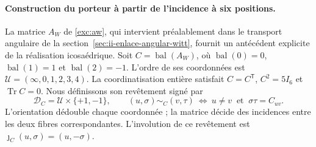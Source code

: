 \paragraph{Construction du porteur à partir de l'incidence à six positions.}
\label{ii:ico:construccion-firmada}
La matrice \(A_W\) de \eqref{exc:aw}, qui intervient préalablement dans le
transport angulaire de la section~\ref{sec:ii-enlace-angular-witt}, fournit
un antécédent explicite de la réalisation icosaédrique. Soit
\(C=\operatorname{bal}(A_W)\), où
\(\operatorname{bal}(0)=0\), \(\operatorname{bal}(1)=1\) et
\(\operatorname{bal}(2)=-1\). L’ordre de ses coordonnées est
\(\mathcal U=(\infty,0,1,2,3,4)\). La coordinatisation entière satisfait
\(C=C^{\mathsf T}\), \(C^2=5I_6\) et \(\operatorname{Tr}C=0\).
Nous définissons son revêtement signé par
\begin{equation}
 \mathcal D_C=\mathcal U\times\{+1,-1\},\qquad
 (u,\sigma)\sim_C(v,\tau)
 \ \Longleftrightarrow\ u\ne v\ \text{ et }\ \sigma\tau=C_{uv}.
 \label{ii:ico:incidencia-firmada}
\end{equation}
L'orientation dédouble chaque coordonnée ; la matrice décide des incidences
entre les deux fibres correspondantes. L'involution de ce revêtement
est \(\jmath_C(u,\sigma)=(u,-\sigma)\).

